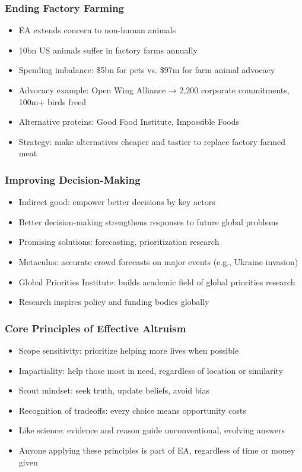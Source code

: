\begin{frame}[fragile]\frametitle{Ending Factory Farming}
      \begin{itemize}
        \item EA extends concern to non-human animals
        \item 10bn US animals suffer in factory farms annually
        \item Spending imbalance: \$5bn for pets vs. \$97m for farm animal advocacy
        \item Advocacy example: Open Wing Alliance → 2,200 corporate commitments, 100m+ birds freed
        \item Alternative proteins: Good Food Institute, Impossible Foods
        \item Strategy: make alternatives cheaper and tastier to replace factory farmed meat
      \end{itemize}
\end{frame}
\begin{frame}[fragile]\frametitle{Improving Decision-Making}
      \begin{itemize}
        \item Indirect good: empower better decisions by key actors
        \item Better decision-making strengthens responses to future global problems
        \item Promising solutions: forecasting, prioritization research
        \item Metaculus: accurate crowd forecasts on major events (e.g., Ukraine invasion)
        \item Global Priorities Institute: builds academic field of global priorities research
        \item Research inspires policy and funding bodies globally
      \end{itemize}
\end{frame}
\begin{frame}[fragile]\frametitle{Core Principles of Effective Altruism}
      \begin{itemize}
        \item Scope sensitivity: prioritize helping more lives when possible
        \item Impartiality: help those most in need, regardless of location or similarity
        \item Scout mindset: seek truth, update beliefs, avoid bias
        \item Recognition of tradeoffs: every choice means opportunity costs
        \item Like science: evidence and reason guide unconventional, evolving answers
        \item Anyone applying these principles is part of EA, regardless of time or money given
      \end{itemize}
\end{frame}
